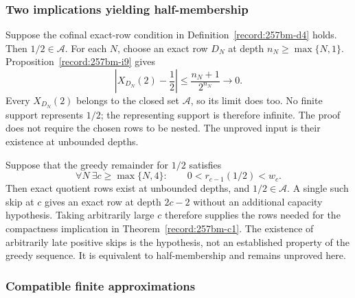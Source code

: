 \subsubsection*{Two implications yielding half-membership}

\begin{thm}\label{record:257bm-c1}
Suppose the cofinal exact-row condition in
Definition~\ref{record:257bm-d4} holds.  Then $1/2\in\mathcal A$.
For each $N$, choose an exact row $D_N$ at depth
$n_N\ge\max\{N,1\}$.  Proposition~\ref{record:257bm-i9} gives
\[
 \left|X_{D_N}(2)-\frac12\right|
       \le\frac{n_N+1}{2^{n_N}}\longrightarrow0.
\]
Every $X_{D_N}(2)$ belongs to the closed set $\mathcal A$, so
its limit does too.  No finite support represents $1/2$;
the representing support is therefore infinite.
The proof does not require the chosen rows to be nested.
The unproved input is their existence at unbounded depths.
\end{thm}

\begin{thm}\label{record:257bm-c2}
Suppose that the greedy remainder for $1/2$ satisfies
\[
 \forall N\ \exists c\ge\max\{N,4\}:\qquad
 0<r_{c-1}(1/2)<w_c.
\]
Then exact quotient rows exist at unbounded depths, and $1/2\in\mathcal A$.
A single such skip at $c$ gives an exact row at depth $2c-2$ without
an additional capacity hypothesis.  Taking arbitrarily large $c$
therefore supplies the rows needed for the compactness implication
in Theorem~\ref{record:257bm-c1}.
The existence of arbitrarily late positive skips is the hypothesis,
not an established property of the greedy sequence.  It is equivalent
to half-membership and remains unproved here.
\end{thm}

\subsubsection*{Compatible finite approximations}

